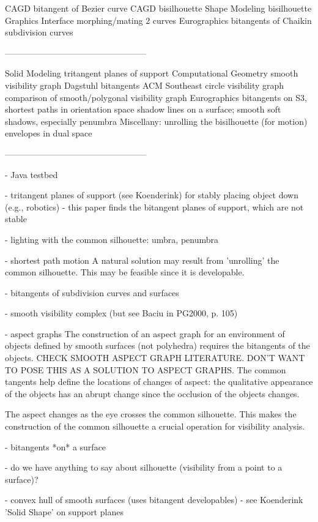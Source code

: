 CAGD			     bitangent of Bezier curve
CAGD			     bisilhouette
Shape Modeling		     bisilhouette
Graphics Interface	     morphing/mating 2 curves
Eurographics		     bitangents of Chaikin subdivision curves

--------------------------------------------------

Solid Modeling 		     tritangent planes of support
Computational Geometry	     smooth visibility graph
Dagstuhl		     bitangents
ACM Southeast		     circle visibility graph
			     comparison of smooth/polygonal visibility graph
Eurographics 		     bitangents on S3, shortest paths in orientation space
			     shadow lines on a surface; smooth soft shadows, especially penumbra
Miscellany: 		     unrolling the bisilhouette (for motion)
			     envelopes in dual space
 
--------------------------------------------------

- Java testbed

- tritangent planes of support (see Koenderink)
  for stably placing object down (e.g., robotics)
  - this paper finds the bitangent planes of support, which are not stable
  
- lighting with the common silhouette: umbra, penumbra

- shortest path motion
 	A natural solution may result from 'unrolling' the common silhouette.
	This may be feasible since it is developable.

- bitangents of subdivision curves and surfaces

- smooth visibility complex (but see Baciu in PG2000, p. 105)

- aspect graphs
	The construction of an aspect graph for an environment of objects
	defined by smooth surfaces (not polyhedra)
	requires the bitangents of the objects.
	CHECK SMOOTH ASPECT GRAPH LITERATURE.
	DON'T WANT TO POSE THIS AS A SOLUTION TO ASPECT GRAPHS.
	The common tangents help define the locations of changes of aspect:
	the qualitative appearance of the objects has an abrupt change
	since the occlusion of the objects changes.
	
	The aspect changes as the eye crosses the common silhouette.
	This makes the construction of the common silhouette
	a crucial operation for visibility analysis.

- bitangents *on* a surface

- do we have anything to say about silhouette (visibility from a 
  point to a surface)?

- convex hull of smooth surfaces (uses bitangent developables)
	- see Koenderink 'Solid Shape' on support planes

